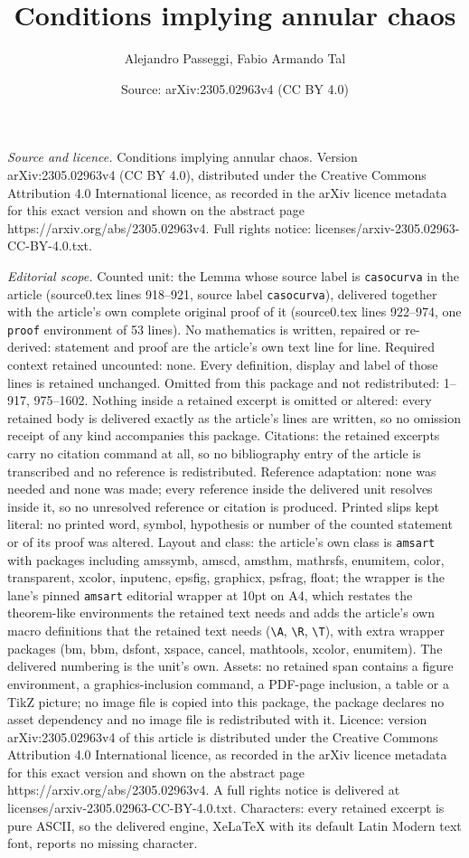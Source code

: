 \documentclass[10pt,a4paper]{amsart}
\title[Conditions implying annular chaos]{Conditions implying annular chaos}
\author{Alejandro Passeggi, Fabio Armando Tal}
\date{Source: arXiv:2305.02963v4 (CC BY 4.0)}
\begin{document}
\maketitle

\noindent\emph{Source and licence.} Conditions implying annular chaos. Version arXiv:2305.02963v4 (CC BY 4.0), distributed under the Creative Commons Attribution 4.0 International licence, as recorded in the arXiv licence metadata for this exact version and shown on the abstract page https://arxiv.org/abs/2305.02963v4. Full rights notice: licenses/arxiv-2305.02963-CC-BY-4.0.txt.\par\smallskip

\noindent\textit{Editorial scope.} Counted unit: the Lemma whose source label is \texttt{casocurva} in the article (source0.tex lines 918--921, source label \texttt{casocurva}), delivered together with the article's own complete original proof of it (source0.tex lines 922--974, one \texttt{proof} environment of 53 lines). No mathematics is written, repaired or re-derived: statement and proof are the article's own text line for line. Required context retained uncounted: none. Every definition, display and label of those lines is retained unchanged. Omitted from this package and not redistributed: 1--917, 975--1602. Nothing inside a retained excerpt is omitted or altered: every retained body is delivered exactly as the article's lines are written, so no omission receipt of any kind accompanies this package. Citations: the retained excerpts carry no citation command at all, so no bibliography entry of the article is transcribed and no reference is redistributed. Reference adaptation: none was needed and none was made; every reference inside the delivered unit resolves inside it, so no unresolved reference or citation is produced. Printed slips kept literal: no printed word, symbol, hypothesis or number of the counted statement or of its proof was altered. Layout and class: the article's own class is \texttt{amsart} with packages including amssymb, amscd, amsthm, mathrsfs, enumitem, color, transparent, xcolor, inputenc, epsfig, graphicx, psfrag, float; the wrapper is the lane's pinned \texttt{amsart} editorial wrapper at 10pt on A4, which restates the theorem-like environments the retained text needs and adds the article's own macro definitions that the retained text needs (\texttt{\textbackslash A}, \texttt{\textbackslash R}, \texttt{\textbackslash T}), with extra wrapper packages (bm, bbm, dsfont, xspace, cancel, mathtools, xcolor, enumitem). The delivered numbering is the unit's own. Assets: no retained span contains a figure environment, a graphics-inclusion command, a PDF-page inclusion, a table or a TikZ picture; no image file is copied into this package, the package declares no asset dependency and no image file is redistributed with it. Licence: version arXiv:2305.02963v4 of this article is distributed under the Creative Commons Attribution 4.0 International licence, as recorded in the arXiv licence metadata for this exact version and shown on the abstract page https://arxiv.org/abs/2305.02963v4. A full rights notice is delivered at licenses/arxiv-2305.02963-CC-BY-4.0.txt. Characters: every retained excerpt is pure ASCII, so the delivered engine, XeLaTeX with its default Latin Modern text font, reports no missing character.
\end{document}
